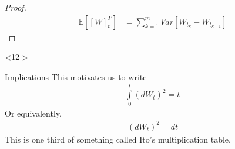 \documentclass[10pt]{beamer}
\begin{document}
\begin{frame}[t]
\begin{onlyenv}
\begin{proof}
      \begin{align*}
        \mathbb{E}\left[[W]^{P}_{t}\right] &= \displaystyle\sum_{k = 1}^{m}Var\left[W_{t_k} - W_{t_{k-1}}\right]
      \end{align*}
      \end{proof}
    \end{onlyenv}
    \begin{onlyenv}<12->
      \begin{block}{Implications}
        This motivates us to write 
        \begin{align*}
          \int\limits_{0}^{t}(dW_t)^2 = t
        \end{align*}
        Or equivalently,
        \begin{align*}
          (dW_t)^2 = dt
        \end{align*}
        This is one third of something called Ito's multiplication table.
      \end{block}
  \end{onlyenv}
\end{frame}
\end{document}
